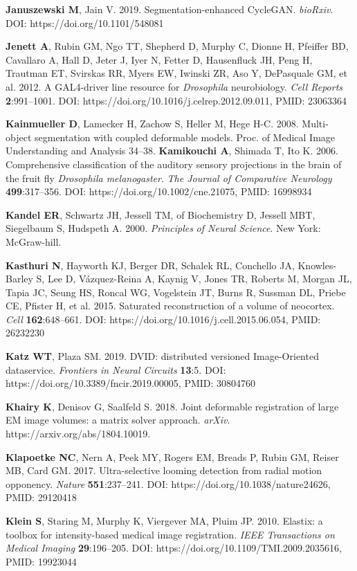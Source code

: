 \documentclass{article}
\begin{document}
\begin{hangpars}
\textbf{Januszewski M}, Jain V. 2019. Segmentation-enhanced CycleGAN. \emph{bioRxiv}. DOI: https://doi.org/10.1101/548081

\textbf{Jenett A}, Rubin GM, Ngo TT, Shepherd D, Murphy C, Dionne H, Pfeiffer BD, Cavallaro A, Hall D, Jeter J, Iyer N, Fetter D, Hausenfluck JH, Peng H, Trautman ET, Svirskas RR, Myers EW, Iwinski ZR, Aso Y, DePasquale GM, et al. 2012. A GAL4-driver line resource for \emph{Drosophila} neurobiology. \emph{Cell Reports} \textbf{2}:991–1001. DOI: https://doi.org/10.1016/j.celrep.2012.09.011, PMID: 23063364

\textbf{Kainmueller D}, Lamecker H, Zachow S, Heller M, Hege H-C. 2008. Multi-object segmentation with coupled deformable models. Proc. of Medical Image Understanding and Analysis 34–38. \textbf{Kamikouchi A}, Shimada T, Ito K. 2006. Comprehensive classification of the auditory sensory projections in the brain of the fruit fly \emph{Drosophila melanogaster}. \emph{The Journal of Comparative Neurology} \textbf{499}:317–356. DOI: https://doi.org/10.1002/cne.21075, PMID: 16998934

\textbf{Kandel ER}, Schwartz JH, Jessell TM, of Biochemistry D, Jessell MBT, Siegelbaum S, Hudspeth A. 2000. \emph{Principles} \emph{of Neural Science}. New York: McGraw-hill.

\textbf{Kasthuri N}, Hayworth KJ, Berger DR, Schalek RL, Conchello JA, Knowles-Barley S, Lee D, Vázquez-Reina A, Kaynig V, Jones TR, Roberts M, Morgan JL, Tapia JC, Seung HS, Roncal WG, Vogelstein JT, Burns R, Sussman DL, Priebe CE, Pfister H, et al. 2015. Saturated reconstruction of a volume of neocortex. \emph{Cell} \textbf{162}:648–661. DOI: https://doi.org/10.1016/j.cell.2015.06.054, PMID: 26232230

\textbf{Katz WT}, Plaza SM. 2019. DVID: distributed versioned Image-Oriented dataservice. \emph{Frontiers in Neural Circuits} \textbf{13}:5. DOI: https://doi.org/10.3389/fncir.2019.00005, PMID: 30804760

\textbf{Khairy K}, Denisov G, Saalfeld S. 2018. Joint deformable registration of large EM image volumes: a matrix solver approach. \emph{arXiv}. https://arxiv.org/abs/1804.10019.

\textbf{Klapoetke NC}, Nern A, Peek MY, Rogers EM, Breads P, Rubin GM, Reiser MB, Card GM. 2017. Ultra-selective looming detection from radial motion opponency. \emph{Nature} \textbf{551}:237–241. DOI: https://doi.org/10.1038/nature24626, PMID: 29120418

\textbf{Klein S}, Staring M, Murphy K, Viergever MA, Pluim JP. 2010. Elastix: a toolbox for intensity-based medical image registration. \emph{IEEE Transactions on Medical Imaging} \textbf{29}:196–205. DOI: https://doi.org/10.1109/TMI.2009.2035616, PMID: 19923044


\end{hangpars}
\end{document}
